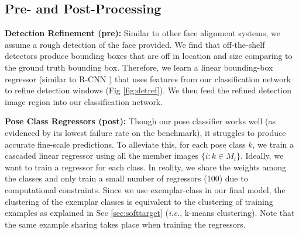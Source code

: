 \documentclass[letterpaper]{article} %
\newcommand{\ie}{\textit{i.e.}}
\begin{document}
\subsection{Pre- and Post-Processing}

{\bf Detection Refinement (pre):}
Similar to other face alignment systems, we assume a rough detection of the face provided. We find that off-the-shelf detectors produce bounding boxes that are off in location and size comparing to the ground truth bounding box. Therefore, we learn a linear bounding-box regressor (similar to R-CNN \cite{girshick14CVPR}) that uses features from our classification network to refine detection windows (Fig \ref{fig:detref}). We then feed the refined detection image region into our classification network.

{\bf Pose Class Regressors (post):}
Though our pose classifier works well (as evidenced by its lowest failure rate on the benchmark), it struggles to produce accurate fine-scale predictions.
To alleviate this, for each pose class $k$, we train a cascaded linear regressor \cite{Xiong2013} using all the member images $\{i: k \in M_i\}$. 
Ideally, we want to train a regressor for each class. In reality, we share the weights among the classes and only train a small number of regressors (100) due to computational constraints. Since we use exemplar-class in our final model, the clustering of the exemplar classes is equivalent to the clustering of training examples as explained in Sec \ref{sec:softtarget}
(\ie, k-means clustering).  Note that the same example sharing takes place when training the regressors.

\end{document}
